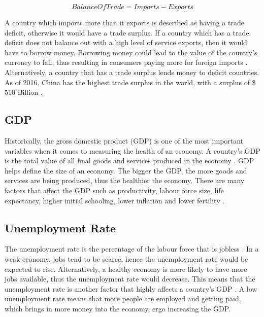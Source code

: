 \documentclass{UoYCSproject}
\begin{document}
\begin{equation}
    Balance Of Trade = Imports - Exports
\end{equation}

A country which imports more than it exports is described as having a trade deficit, otherwise it would have a trade surplus. If a country which has a trade deficit does not balance out with a high level of service exports, then it would have to borrow money. Borrowing money could lead to the value of the country's currency to fall, thus resulting in consumers paying more for foreign imports \cite{2003economics}. Alternatively, a country that has a trade surplus lends money to deficit countries. As of 2016, China has the highest trade surplus in the world, with a surplus of \$$510$ Billion \cite{tradesurplus}.   

\subsection{GDP}
Historically, the gross domestic product (GDP) is one of the most important variables when it comes to measuring the health of an economy. A country's GDP is the total value of all final goods and services produced in the economy \cite{2003economics}. GDP helps define the size of an economy. The bigger the GDP, the more goods and services are being produced, thus the healthier the economy.  There are many factors that affect the GDP such as productivity, labour force size, life expectancy, higher initial schooling, lower inflation and lower fertility \cite{barro1996determinants}. 

\subsection{Unemployment Rate}
The unemployment rate is the percentage of the labour force that is jobless \cite{unemployment}. In a weak economy, jobs tend to be scarce, hence the unemployment rate would be expected to rise. Alternatively, a healthy economy is more likely to have more jobs available, thus the unemployment rate would decrease. This means that the unemployment rate is another factor that highly affects a country's GDP \cite{bean1993unemployment}. A low unemployment rate means that more people are employed and getting paid, which brings in more money into the economy, ergo increasing the GDP.  
\end{document}
